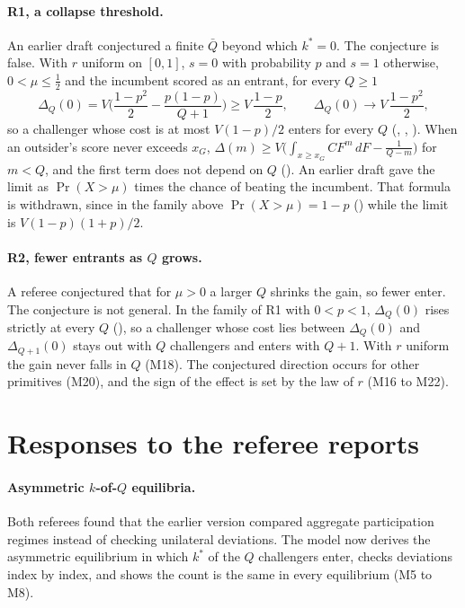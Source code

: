 \paragraph{R1, a collapse threshold.} An earlier draft conjectured a finite
$\bar Q$ beyond which $k^*=0$. The conjecture is false. With $r$ uniform on
$[0,1]$, $s=0$ with probability $p$ and $s=1$ otherwise, $0<\mu\le\frac12$ and
the incumbent scored as an entrant, for every $Q\ge1$
\[
  \Delta_Q(0)=V\Big(\frac{1-p^2}2-\frac{p(1-p)}{Q+1}\Big)\ge V\,\frac{1-p}2,
  \qquad \Delta_Q(0)\to V\,\frac{1-p^2}2,
\]
so a challenger whose cost is at most $V(1-p)/2$ enters for every $Q$
(, ,
). When an outsider's score never
exceeds $x_G$, $\Delta(m)\ge V\big(\int_{x\ge x_G}CF^m\,dF-\frac1{Q-m}\big)$ for
$m<Q$, and the first term does not depend on $Q$
(). An earlier draft gave the limit as
$\Pr(X>\mu)$ times the chance of beating the incumbent. That formula is
withdrawn, since in the family above $\Pr(X>\mu)=1-p$
() while the limit is
$V(1-p)(1+p)/2$.

\paragraph{R2, fewer entrants as $Q$ grows.} A referee conjectured that for
$\mu>0$ a larger $Q$ shrinks the gain, so fewer enter. The conjecture is not
general. In the family of R1 with $0<p<1$, $\Delta_Q(0)$ rises strictly at
every $Q$ (), so a challenger
whose cost lies between $\Delta_Q(0)$ and $\Delta_{Q+1}(0)$ stays out with $Q$
challengers and enters with $Q+1$. With $r$ uniform the gain never falls in $Q$
(M18). The conjectured direction occurs for other primitives (M20), and the
sign of the effect is set by the law of $r$ (M16 to M22).

\section{Responses to the referee reports}
\label{app:referees}

\paragraph{Asymmetric $k$-of-$Q$ equilibria.} Both referees found that the
earlier version compared aggregate participation regimes instead of checking
unilateral deviations. The model now derives the asymmetric equilibrium in
which $k^*$ of the $Q$ challengers enter, checks deviations index by index, and
shows the count is the same in every equilibrium (M5 to M8).

